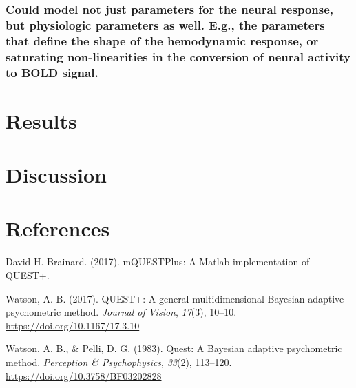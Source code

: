 \documentclass[
  english,
  man,floatsintext]{apa6}
\begin{document}
\hypertarget{could-model-not-just-parameters-for-the-neural-response-but-physiologic-parameters-as-well.-e.g.-the-parameters-that-define-the-shape-of-the-hemodynamic-response-or-saturating-non-linearities-in-the-conversion-of-neural-activity-to-bold-signal.}{%
\subsubsection{Could model not just parameters for the neural response, but physiologic parameters as well. E.g., the parameters that define the shape of the hemodynamic response, or saturating non-linearities in the conversion of neural activity to BOLD signal.}\label{could-model-not-just-parameters-for-the-neural-response-but-physiologic-parameters-as-well.-e.g.-the-parameters-that-define-the-shape-of-the-hemodynamic-response-or-saturating-non-linearities-in-the-conversion-of-neural-activity-to-bold-signal.}}

\hypertarget{results-1}{%
\section{Results}\label{results-1}}

\hypertarget{discussion-1}{%
\section{Discussion}\label{discussion-1}}

\newpage

\hypertarget{references}{%
\section{References}\label{references}}

\begingroup
\setlength{\parindent}{-0.5in}
\setlength{\leftskip}{0.5in}

\hypertarget{refs}{}
\leavevmode\hypertarget{ref-davidh.brainardMQUESTPlusMatlabImplementation2017}{}%
David H. Brainard. (2017). mQUESTPlus: A Matlab implementation of QUEST+.

\leavevmode\hypertarget{ref-watsonQUESTGeneralMultidimensional2017}{}%
Watson, A. B. (2017). QUEST+: A general multidimensional Bayesian adaptive psychometric method. \emph{Journal of Vision}, \emph{17}(3), 10--10. \url{https://doi.org/10.1167/17.3.10}

\leavevmode\hypertarget{ref-watsonQuestBayesianAdaptive1983}{}%
Watson, A. B., \& Pelli, D. G. (1983). Quest: A Bayesian adaptive psychometric method. \emph{Perception \& Psychophysics}, \emph{33}(2), 113--120. \url{https://doi.org/10.3758/BF03202828}

\endgroup
\end{document}
